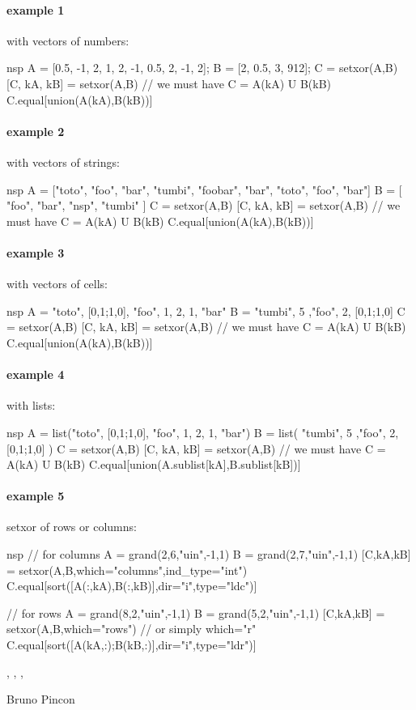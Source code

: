 \begin{examples}

\paragraph{example 1} with vectors of numbers:
\begin{mintednsp}{nsp}
A = [0.5, -1, 2, 1, 2, -1, 0.5, 2, -1, 2];
B = [2, 0.5, 3, 912];
C = setxor(A,B)
[C, kA, kB] = setxor(A,B)
// we must have C = A(kA) U B(kB) 
C.equal[union(A(kA),B(kB))]
\end{mintednsp}

\paragraph{example 2} with vectors of strings:
\begin{mintednsp}{nsp}
A = ["toto", "foo", "bar", "tumbi", "foobar", "bar", "toto", "foo", "bar"]
B = [ "foo", "bar", "nsp", "tumbi" ]
C = setxor(A,B)
[C, kA, kB] = setxor(A,B)
// we must have C = A(kA) U B(kB) 
C.equal[union(A(kA),B(kB))]
\end{mintednsp}

\paragraph{example 3} with vectors of cells:
\begin{mintednsp}{nsp}
A = {"toto", [0,1;1,0], "foo", 1, 2, 1, "bar"}
B = {  "tumbi", 5 ,"foo", 2,  [0,1;1,0] }
C = setxor(A,B)
[C, kA, kB] = setxor(A,B)
// we must have C = A(kA) U B(kB) 
C.equal[union(A(kA),B(kB))]
\end{mintednsp}

\paragraph{example 4} with lists:
\begin{mintednsp}{nsp}
A = list("toto", [0,1;1,0], "foo", 1, 2, 1, "bar")
B = list(  "tumbi", 5 ,"foo", 2,  [0,1;1,0] )
C = setxor(A,B)
[C, kA, kB] = setxor(A,B)
// we must have C = A(kA) U B(kB) 
C.equal[union(A.sublist[kA],B.sublist[kB])]
\end{mintednsp}

\paragraph{example 5} setxor of rows or columns:
\begin{mintednsp}{nsp}
// for columns
A = grand(2,6,"uin",-1,1)
B = grand(2,7,"uin",-1,1)
[C,kA,kB] = setxor(A,B,which="columns",ind_type="int")
C.equal[sort([A(:,kA),B(:,kB)],dir="i",type="ldc")]

// for rows
A = grand(8,2,"uin",-1,1)
B = grand(5,2,"uin",-1,1)
[C,kA,kB] = setxor(A,B,which="rows")  // or simply which="r"
C.equal[sort([A(kA,:);B(kB,:)],dir="i",type="ldr")]

\end{mintednsp}

\end{examples}

\begin{manseealso}
  , , ,    
\end{manseealso}

\begin{authors}
  Bruno Pincon
\end{authors}
